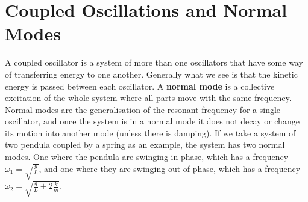 \documentclass[../classical_mechanics.tex]{subfiles}
\begin{document}
    \section{Coupled Oscillations and Normal Modes}\label{sec:coupled-oscillations-and-normal-modes}
        A coupled oscillator is a system of more than one oscillators that have some way of transferring energy to one another.
        Generally what we see is that the kinetic energy is passed between each oscillator.
        A \textbf{normal mode} is a collective excitation of the whole system where all parts move with the same frequency.
        Normal modes are the generalisation of the resonant frequency for a single oscillator, and once the system is in a normal mode it does not decay or change its motion into another mode (unless there is damping).
        If we take a system of two pendula coupled by a spring as an example, the system has two normal modes.
        One where the pendula are swinging in-phase, which has a frequency $\omega_1=\sqrt{\frac{g}{L}}$, and one where they are swinging out-of-phase, which has a frequency $\omega_2=\sqrt{\frac{g}{L}+2\frac{k}{m}}$.
\end{document}

